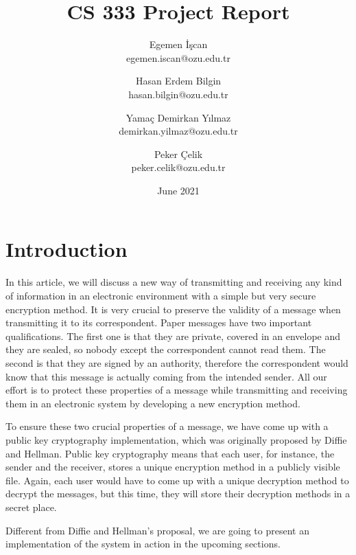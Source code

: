 \documentclass[12pt, letterpaper]{article}
\begin{document}
\title{\huge\textbf{CS 333 Project Report}}
\author{
Egemen İşcan\\
egemen.iscan@ozu.edu.tr
\and
Hasan Erdem Bilgin\\
hasan.bilgin@ozu.edu.tr
\and
Yamaç Demirkan Yılmaz\\
demirkan.yilmaz@ozu.edu.tr
\and
Peker Çelik\\
peker.celik@ozu.edu.tr
}
\date{June 2021}

\renewcommand\thesection{\Roman{section}.}
\renewcommand{\thesubsection}{\Alph{subsection}.}
\setlength{\parindent}{4em}
\setlength{\parskip}{1em}

\maketitle
\newpage
\tableofcontents

\newpage

\section{Introduction}

In this article, we will discuss a new way of transmitting and receiving any kind of information in an electronic environment with a simple but very secure encryption method. It is very crucial to preserve the validity of a message when transmitting it to its correspondent. Paper messages have two important qualifications. The first one is that they are private, covered in an envelope and they are sealed, so nobody except the correspondent cannot read them. The second is that they are signed by an authority, therefore the correspondent would know that this message is actually coming from the intended sender. All our effort is to protect these properties of a message while transmitting and receiving them in an electronic system by developing a new encryption method.

To ensure these two crucial properties of a message, we have come up with a public key cryptography implementation, which was originally proposed by Diffie and Hellman. Public key cryptography means that each user, for instance, the sender and the receiver, stores a unique encryption method in a publicly visible file. Again, each user would have to come up with a unique decryption method to decrypt the messages, but this time, they will store their decryption methods in a secret place.

Different from Diffie and Hellman’s proposal, we are going to present an implementation of the system in action in the upcoming sections.
\end{document}
